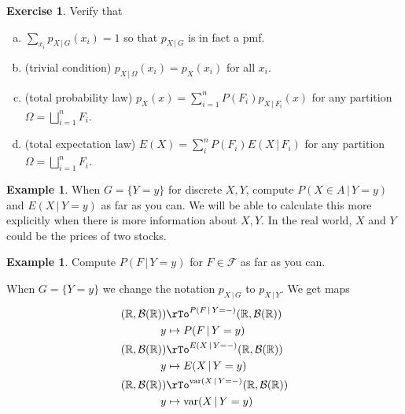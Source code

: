 \documentclass[12pt]{amsart}
\theoremstyle{definition}
\newtheorem{example}[theorem]{Example}
\newtheorem{exercise}[theorem]{Exercise}
\begin{document}
\begin{exercise} Verify that
\begin{enumerate}[a.]
\item $\sum\limits_{x_i} p_{X \,|\, G}(x_i) = 1$ so that $p_{X \,|\, G}$ is in fact a pmf.
\item (trivial condition) $p_{X \,|\, \Omega}(x_i) = p_X(x_i)$ for all $x_i$.
\item (total probability law) $p_X(x) = \sum\limits_{i=1}^n P(F_i)p_{X \,|\, F_i}(x)$ for any partition $\Omega = \bigsqcup\limits_{i = 1}^n F_i$.
\item (total expectation law) $E(X) = \sum\limits_i^n P(F_i)E(X \,|\, F_i)$ for any partition $\Omega = \bigsqcup\limits_{i = 1}^n F_i$.
\end{enumerate}
\end{exercise}

\begin{example} \label{G_is_Y_equals_y} When $G = \{Y = y\}$ for discrete $X, Y$, compute $P(X \in A \,|\, Y = y)$ and $E(X \,|\, Y = y)$ as far as you can. We will be able to calculate this more explicitly when there is more information about $X, Y$. In the real world, $X$ and $Y$ could be the prices of two stocks.
\end{example}

\begin{example} Compute $P(F \,|\, Y = y)$ for $F \in \mathcal{F}$ as far as you can.
\end{example}

When $G = \{Y = y\}$ we change the notation $p_{X \,|\, G}$ to $p_{X \,|\, Y}$. We get maps
\begin{align*}
(\mathbb{R}, \mathcal{B}(\mathbb{R})) & \rTo^{P(F \,|\, Y = -)} (\mathbb{R}, \mathcal{B}(\mathbb{R})) \\
y & \mapsto P(F \,|\, Y = y) \\
(\mathbb{R}, \mathcal{B}(\mathbb{R})) & \rTo^{E(X \,|\, Y = -)} (\mathbb{R}, \mathcal{B}(\mathbb{R})) \\
y & \mapsto E(X \,|\, Y = y) \\
(\mathbb{R}, \mathcal{B}(\mathbb{R})) & \rTo^{\text{var}(X \,|\, Y = -)} (\mathbb{R}, \mathcal{B}(\mathbb{R})) \\
y & \mapsto \text{var}(X \,|\, Y = y)
\end{align*}
\end{document}
